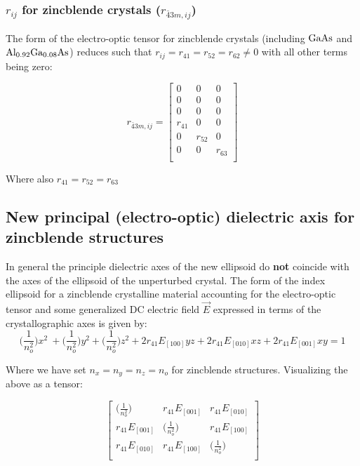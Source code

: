 
\subsubsection{\texorpdfstring{$r_{ij}$}{rij} for zincblende crystals (\texorpdfstring{$r_{\bar{4}3m, ij}$}{r43})}

The form of the electro-optic tensor for zincblende crystals (including $\mathrm{GaAs}$ and $\mathrm{Al_{0.92}Ga_{0.08}As}$) reduces such that $r_{ij} = r_{41} = r_{52} = r_{62} \neq 0$ with all other terms being zero:

\begin{equation}
r_{\bar{4}3m,ij} =
 \left[ {\begin{array}{ccc}
  0 & 0 & 0\\
  0 & 0 & 0\\
  0 & 0 & 0\\
  r_{41} & 0 & 0\\
  0 & r_{52} & 0\\
  0 & 0 & r_{63}\\
 \end{array}} \right]
\end{equation}

\noindent Where also $r_{41} = r_{52} = r_{63}$

\subsection{New principal (electro-optic) dielectric axis for zincblende structures}
In general the principle dielectric axes of the new ellipsoid do \textbf{not} coincide with the axes of the ellipsoid of the unperturbed crystal. The form of the index ellipsoid for a zincblende crystalline material accounting for the electro-optic tensor and some generalized DC electric field $\vec{E}$ expressed in terms of the crystallographic axes is given by:
\begin{equation}\label{eq:zindicatrix}
\bigg(\frac{1}{n_o^2} \bigg) x^2\ + \bigg(\frac{1}{n_o^2} \bigg) y^2 + \bigg(\frac{1}{n_o^2} \bigg) z^2  + 2r_{41} E_{[100]} yz + 2r_{41} E_{[010]} xz + 2r_{41}E_{[001]} xy= 1
\end{equation}

\noindent Where we have set $n_x = n_y = n_z = n_o$ for zincblende structures. Visualizing the above as a tensor:

\begin{equation}
\left[ {\begin{array}{ccc}
   \big( \frac{1}{n_o ^2} \big)& r_{41}E_{[001]} & r_{41} E_{[010]}\\
   r_{41}E_{[001]} & \big( \frac{1}{n_o ^2} \big) & r_{41} E_{[100]}\\
   r_{41} E_{[010]} & r_{41} E_{[100]} & \big( \frac{1}{n_o ^2} \big)\\
\end{array}} \right]
\end{equation}

